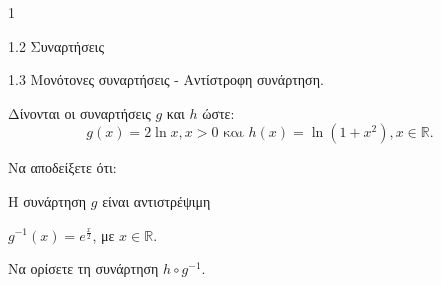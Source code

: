 \begin{ylh}{1}
    \item 1.2 Συναρτήσεις
    \item 1.3 Μονότονες συναρτήσεις - Αντίστροφη συνάρτηση.
\end{ylh}
Δίνονται οι συναρτήσεις $g$ και $h$ ώστε:
\[ g(x) = 2\ln x, x>0 \text{ και } h(x) = \ln(1 + x^2), x \in \mathbb{R}. \]
\begin{alist}
\item Να αποδείξετε ότι:
    \begin{rlist}
    \item Η συνάρτηση $g$ είναι αντιστρέψιμη 
    \item $g^{-1}(x) = e^{\frac{x}{2}}$, με $x \in \mathbb{R}$. 
    \end{rlist}
\item Να ορίσετε τη συνάρτηση $h \circ g^{-1}$. 
\end{alist}